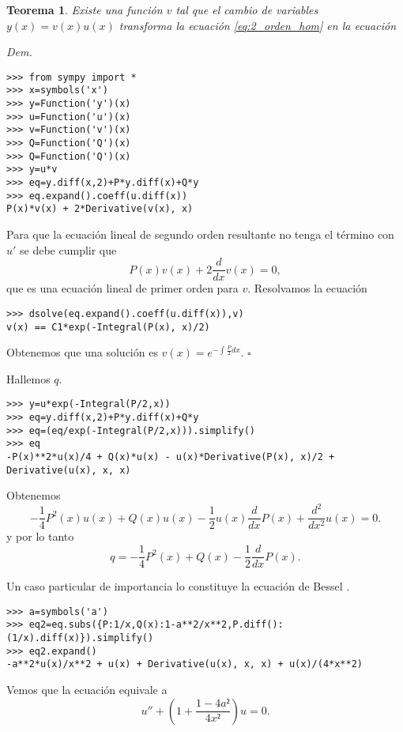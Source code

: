 \documentclass{article}
\newenvironment{demo}{\noindent\emph{Dem.}}{{\hspace*{\fill}$\square$} \newline\vspace{5pt}}
\newtheorem{teorema}{Teorema}[section]
\begin{document}
\begin{teorema} Existe una función $v$ tal que el cambio de variables $y(x)=v(x)u(x)$ transforma la ecuación \eqref{eq:2_orden_hom} en la ecuación
\end{teorema}
\begin{demo} 
\begin{lstlisting}
>>> from sympy import *
>>> x=symbols('x')
>>> y=Function('y')(x)
>>> u=Function('u')(x)
>>> v=Function('v')(x)
>>> Q=Function('Q')(x)
>>> Q=Function('Q')(x)
>>> y=u*v
>>> eq=y.diff(x,2)+P*y.diff(x)+Q*y
>>> eq.expand().coeff(u.diff(x))
P(x)*v(x) + 2*Derivative(v(x), x)

\end{lstlisting}

Para que la ecuación lineal de segundo orden resultante no tenga el término con $u'$ se debe cumplir que
\[ P{\left (x \right )} v{\left (x \right )} + 2 \frac{d}{d x} v{\left (x \right )}=0,\]
que es una ecuación lineal de primer orden para $v$. Resolvamos la ecuación

\begin{lstlisting}
>>> dsolve(eq.expand().coeff(u.diff(x)),v)
v(x) == C1*exp(-Integral(P(x), x)/2)
\end{lstlisting}

Obtenemos que una solución es $v(x)=e^{-\int\frac{P}{2}dx}$.
\end{demo}

Hallemos $q$.
\begin{lstlisting}
>>> y=u*exp(-Integral(P/2,x))
>>> eq=y.diff(x,2)+P*y.diff(x)+Q*y
>>> eq=(eq/exp(-Integral(P/2,x))).simplify()
>>> eq
-P(x)**2*u(x)/4 + Q(x)*u(x) - u(x)*Derivative(P(x), x)/2 + Derivative(u(x), x, x)
\end{lstlisting}


Obtenemos
\[\boxed{- \frac{1}{4} P^{2}{\left (x \right )} u{\left (x \right )} + Q{\left (x \right 
)} u{\left (x \right )} - \frac{1}{2} u{\left (x \right )} \frac{d}{d x} P{\left
 (x \right )} + \frac{d^{2}}{d x^{2}}  u{\left (x \right )}=0}.\]
y por lo tanto
\[\boxed{q=- \frac{1}{4} P^{2}{\left (x \right )} + Q{\left (x \right )} - \frac{1}{2} \frac{d}{d x} P{\left (x \right )}}.\]
 
\begin{ejemplo} Un caso particular de importancia lo constituye la ecuación de Bessel
 .

\begin{lstlisting}
>>> a=symbols('a') 
>>> eq2=eq.subs({P:1/x,Q(x):1-a**2/x**2,P.diff():(1/x).diff(x)}).simplify()
>>> eq2.expand()
-a**2*u(x)/x**2 + u(x) + Derivative(u(x), x, x) + u(x)/(4*x**2)
\end{lstlisting}

Vemos que la ecuación equivale a
\begin{equation}\label{bessel_normal}\boxed{u''+\left(1+\frac{1-4a²}{4x²}\right)u=0}.
\end{equation}
\end{ejemplo}
\end{document}
